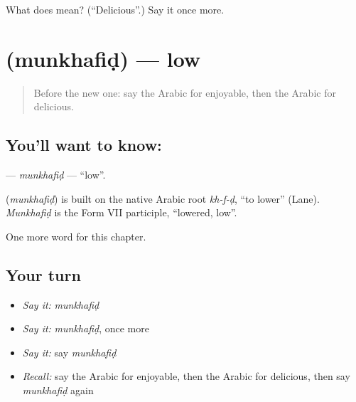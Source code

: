 \begin{tcolorbox}[breakable,colback=teal!4,colframe=teal!35!black,title={Before you move on}]
What does  mean? (\textquotedblleft{}Delicious\textquotedblright{}.) Say it once more.
\end{tcolorbox}
\section[\texorpdfstring{\ar{منخفض} (munkhafiḍ)}{منخفض (munkhafiḍ)}]{ (munkhafiḍ) — low}

\label{lesson:AR-C150-munkhafid}



\begin{quote}
Before the new one: say the Arabic for enjoyable, then the Arabic for delicious.
\end{quote}

\subsection*{You'll want to know: }
\textbf{} — \emph{munkhafiḍ} — \textquotedblleft{}low\textquotedblright{}.

\begin{cousinweb}
\textbf{} (\emph{munkhafiḍ}) is built on the native Arabic root \emph{kh-f-ḍ}, \textquotedblleft{}to lower\textquotedblright{} (Lane). \emph{Munkhafiḍ} is the Form VII participle, \textquotedblleft{}lowered, low\textquotedblright{}.
\end{cousinweb}

\begin{grammarlens}[title={What you've built}]
One more word for this chapter.
\end{grammarlens}

\subsection*{Your turn}
\begin{itemize}
\raggedright
  \item \emph{Say it:} \emph{munkhafiḍ}
  \item \emph{Say it:} \emph{munkhafiḍ}, once more
  \item \emph{Say it:} say \emph{munkhafiḍ}
  \item \emph{Recall:} say the Arabic for enjoyable, then the Arabic for delicious, then say \emph{munkhafiḍ} again
\end{itemize}

